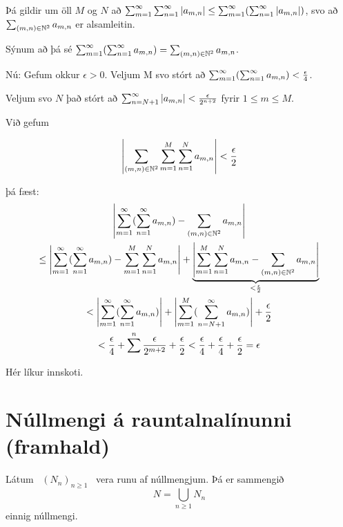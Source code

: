 \documentclass[12pt]{report}
\begin{document}
{

  \def\mn{(m,n)} \def\amn{a_{m,n}} \def\summn{\sum_{\mn \in \N^2}}

  Þá gildir um öll $M$ og $N$ að
  $\sum_{m=1}^{\infty} \sum_{n=1}^{\infty} \abs{\amn} \leq \summinfty
  (\sumoinfty \abs{\amn})$,
  svo að $\sum_{\mn \in \N^2} \amn$ er alsamleitin.

  Sýnum að þá sé $\summinfty ( \sumoinfty \amn ) = \summn \amn$.

  Nú: Gefum okkur $\epsilon > 0$. Veljum M svo stórt að
  $\summinfty ( \sumoinfty \amn ) < \eps{4}$.

  Veljum svo $N$ það stórt að
  $\sum_{n = N+1}^{\infty} \abs{\amn} < \eps{2^{n+2}}$ fyrir
  $1 \leq m \leq M$.


  Við gefum

  \[\abs{\sum_{(m,n) \in \N^2} \sum_{m=1}^M \sum_{n=1}^N \amn } <
  \eps{2} \]

  þá fæst:
  \begin{gather*}
    \abs{\summinfty ( \sumoinfty \amn) - \sum_{(m,n) \in \N^2} \amn}\\
    \leq \abs{\summinfty ( \sumoinfty \amn) - \sum_{m=1}^{M} \sum_{n=1}^N \amn}
    + \underbrace{\abs{\sum_{m=1}^M \sum_{n=1}^N \amn - \sum_{(m,n) \in \N^2} \amn}}_{< \eps{2}}\\
    < \abs{\summinfty ( \sumoinfty \amn)} + \abs{\sum_{m=1}^M ( \sum_{n = N+1}^{\infty} \amn)} + \eps{2}\\
    < \eps{4} + \sum^n \eps{2^{m+2}} + \eps{2} < \eps{4} + \eps{4} +
    \eps{2} = \epsilon
  \end{gather*}

  Hér líkur innskoti.

}

\section{Núllmengi á rauntalnalínunni (framhald)}
\begin{setn*}
Látum \ $(N_n)_{n\geq 1}$ \ vera runu af núllmengjum. Þá er sammengið 
\[
N = \bigcup_{n\geq 1}N_n
\]
einnig núllmengi.
\end{setn*}
\end{document}
